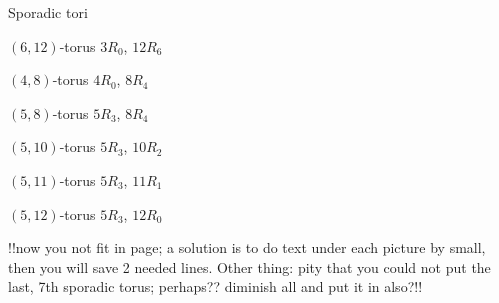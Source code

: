 \documentclass[%
pdf,
colorBG,
slideColor,
]{prosper}
\begin{document}
\begin{slide}{Sporadic tori}

\begin{center}
\begin{minipage}{3.75cm}
\centering
{}\par
$(6,12)$-torus $3R_0$, $12R_6$
\end{minipage}
\begin{minipage}{3.75cm}
\centering
{}\par
$(4,8)$-torus $4R_0$, $8R_4$
\end{minipage}
\begin{minipage}{3.75cm}
\centering
{}\par
$(5,8)$-torus $5R_3$, $8R_4$
\end{minipage}
\begin{minipage}{3.75cm}
\centering
{}\par
$(5,10)$-torus $5R_3$, $10R_2$
\end{minipage}
\begin{minipage}{3.75cm}
\centering
{}\par
$(5,11)$-torus $5R_3$, $11R_1$
\end{minipage}
\begin{minipage}{3.75cm}
\centering
{}\par
$(5,12)$-torus $5R_3$, $12R_0$
\end{minipage}
!!now you not fit in page; a solution is to do text under each picture 
by small, then you will save 2 needed lines. Other thing: pity that you 
could not put the last, 7th sporadic torus; perhaps?? diminish all and put 
it in also?!! 
\end{center}


\end{slide}
\end{document}
